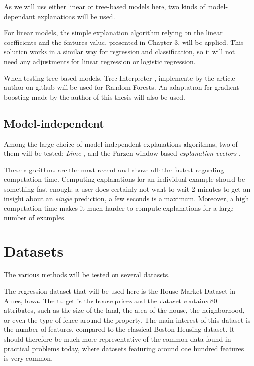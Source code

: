 \documentclass[a4paper,11pt]{kth-mag}
\begin{document}
As we will use either linear or tree-based models here, two kinds of model-dependant explanations will be used.

For linear models, the simple explanation algorithm relying on the linear coefficients and the features value, presented in Chapter 3, will be applied. This solution works in a similar way for regression and classification, so it will not need any adjustments for linear regression or logistic regression.

When testing tree-based models, Tree Interpreter \cite{treeinterpreter}, implemente by the article author on github will be used for Random Forests. An adaptation for gradient boosting made by the author of this thesis will also be used.

\subsection{Model-independent}

Among the large choice of model-independent explanations algorithms, two of them will be tested: \textit{Lime} \cite{lime}, and the Parzen-window-based \textit{explanation vectors} \cite{explvect}.

These algorithms are the most recent and above all: the fastest regarding computation time. Computing explanations for an individual example should be something fast enough: a user does certainly not want to wait 2 minutes to get an insight about an \textit{single} prediction, a few seconds is a maximum. Moreover, a high computation time makes it much harder to compute explanations for a large number of examples.

\section{Datasets}

The various methods will be tested on several datasets.

The regression dataset that will be used here is the House Market Dataset in Ames, Iowa. The target is the house prices and the dataset contains 80 attributes, such as the size of the land, the area of the house, the neighborhood, or even the type of fence around the property. The main interest of this dataset is the number of features, compared to the classical Boston Housing dataset. It should therefore be much more representative of the common data found in practical problems today, where datasets featuring around one hundred features is very common.
\end{document}
